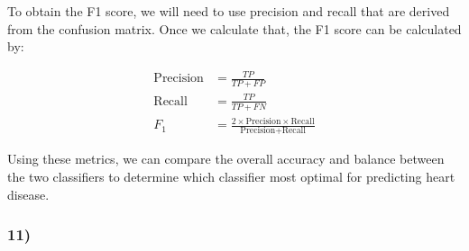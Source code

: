 \documentclass[
  11pt,
  letterpaper,
  DIV=11,
  numbers=noendperiod]{scrartcl}
\begin{document}
To obtain the F1 score, we will need to use precision and recall that
are derived from the confusion matrix. Once we calculate that, the F1
score can be calculated by:

\begin{align*}
\text{Precision} &= \frac{TP}{TP + FP} \\
\text{Recall} &= \frac{TP}{TP + FN} \\
F_1 &= \frac{2 \times \text{Precision} \times \text{Recall}}{\text{Precision} + \text{Recall}}
\end{align*}

Using these metrics, we can compare the overall accuracy and balance
between the two classifiers to determine which classifier most optimal
for predicting heart disease.

\subsubsection{11)}\label{section-10}
\end{document}
